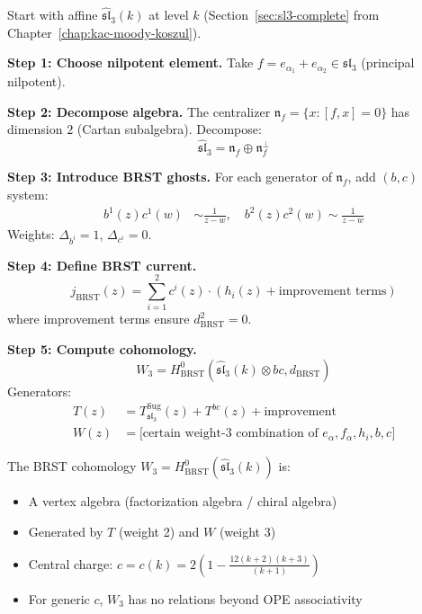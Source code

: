 \begin{construction}
\label{const:w3-reduction}
Start with affine $\widehat{\mathfrak{sl}}_3(k)$ at level $k$ (Section~\ref{sec:sl3-complete} from Chapter~\ref{chap:kac-moody-koszul}).

\textbf{Step 1: Choose nilpotent element.}
Take $f = e_{\alpha_1} + e_{\alpha_2} \in \mathfrak{sl}_3$ (principal nilpotent).

\textbf{Step 2: Decompose algebra.}
The centralizer $\mathfrak{n}_f = \{x : [f,x] = 0\}$ has dimension $2$ (Cartan subalgebra). Decompose:
$$\widehat{\mathfrak{sl}}_3 = \mathfrak{n}_f \oplus \mathfrak{n}_f^{\perp}$$

\textbf{Step 3: Introduce BRST ghosts.}
For each generator of $\mathfrak{n}_f$, add $(b, c)$ system:
\begin{align*}
b^1(z)c^1(w) &\sim \frac{1}{z-w}, \quad b^2(z)c^2(w) \sim \frac{1}{z-w}
\end{align*}
Weights: $\Delta_{b^i} = 1$, $\Delta_{c^i} = 0$.

\textbf{Step 4: Define BRST current.}
$$j_{\text{BRST}}(z) = \sum_{i=1}^2 c^i(z) \cdot (h_i(z) + \text{improvement terms})$$
where improvement terms ensure $d_{\text{BRST}}^2 = 0$.

\textbf{Step 5: Compute cohomology.}
$$W_3 = H^0_{\text{BRST}}\left(\widehat{\mathfrak{sl}}_3(k) \otimes bc, d_{\text{BRST}}\right)$$
Generators:
\begin{align}
T(z) &= T^{\text{Sug}}_{\mathfrak{sl}_3}(z) + T^{bc}(z) + \text{improvement} \label{eq:w3-T-reduction} \\
W(z) &= \text{[certain weight-3 combination of } e_\alpha, f_\alpha, h_i, b, c]
\end{align}
\end{construction}

\begin{theorem}
\label{thm:w3-exists}
The BRST cohomology $W_3 = H^0_{\text{BRST}}(\widehat{\mathfrak{sl}}_3(k))$ is:
\begin{itemize}
\item A vertex algebra (factorization algebra / chiral algebra)
\item Generated by $T$ (weight 2) and $W$ (weight 3)
\item Central charge: $c = c(k) = 2\left(1 - \frac{12(k+2)(k+3)}{(k+1)}\right)$
\item For generic $c$, $W_3$ has no relations beyond OPE associativity
\end{itemize}
\end{theorem}

